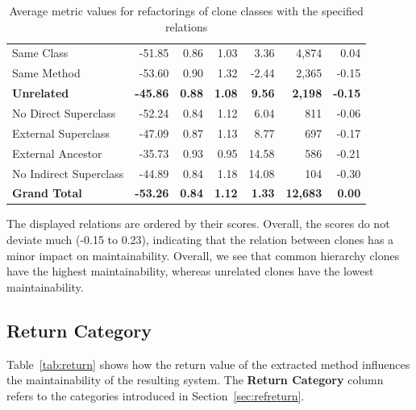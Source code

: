 \begin{table}[H]
{\begin{tabular}{@{}lrrrrrr@{}}
\hspace{10pt} Same Class & -51.85 & 0.86 & 1.03 & 3.36 & 4,874 & 0.04 \\
\hspace{10pt} Same Method & -53.60 & 0.90 & 1.32 & -2.44 & 2,365 & -0.15 \\ \midrule
\textbf{Unrelated} & \textbf{-45.86} & \textbf{0.88} & \textbf{1.08} & \textbf{9.56} & \textbf{2,198} & \textbf{-0.15} \\ \midrule
\hspace{10pt} No Direct Superclass & -52.24 & 0.84 & 1.12 & 6.04 & 811 & -0.06 \\
\hspace{10pt} External Superclass & -47.09 & 0.87 & 1.13 & 8.77 & 697 & -0.17 \\
\hspace{10pt} External Ancestor & -35.73 & 0.93 & 0.95 & 14.58 & 586 & -0.21 \\
\hspace{10pt} No Indirect Superclass & -44.89 & 0.84 & 1.18 & 14.08 & 104 & -0.30 \\ \midrule
\textbf{Grand Total} & \textbf{-53.26} & \textbf{0.84} & \textbf{1.12} & \textbf{1.33} & \textbf{12,683} & \textbf{0.00} \\ \bottomrule
\end{tabular}%
}
\caption{Average metric values for refactorings of clone classes with the specified relations}
\label{tab:relationref}
\end{table}

The displayed relations are ordered by their scores. Overall, the scores do not deviate much (-0.15 to 0.23), indicating that the relation between clones has a minor impact on maintainability. Overall, we see that common hierarchy clones have the highest maintainability, whereas unrelated clones have the lowest maintainability.

\subsection{Return Category}
Table~\ref{tab:return} shows how the return value of the extracted method influences the maintainability of the resulting system. The \textbf{Return Category} column refers to the categories introduced in Section~\ref{sec:refreturn}.

